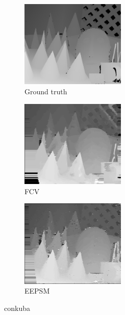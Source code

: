 \begin{figure}[ht]
  \centering
  \begin{subfigure}[t]{0.3\textwidth}
    \centering\includegraphics[width=5cm]{figures/con_gt}
    \caption{Ground truth \cite{Scharstein2003}\label{fig:con_gt}}
  \end{subfigure}\hspace{0.5cm}
  \begin{subfigure}[t]{0.3\textwidth}
    \centering\includegraphics[width=5cm]{figures/con_fcv}
    \caption{FCV\label{fig:con_fcv}}
  \end{subfigure}\hspace{0.5cm}
  \begin{subfigure}[t]{0.3\textwidth}
    \centering\includegraphics[width=5cm]{figures/con_eepsm1}
    \caption{EEPSM\label{fig:con_eepsm}}
  \end{subfigure}
  \caption{conkuba \label{fig:conall}}
\end{figure}


